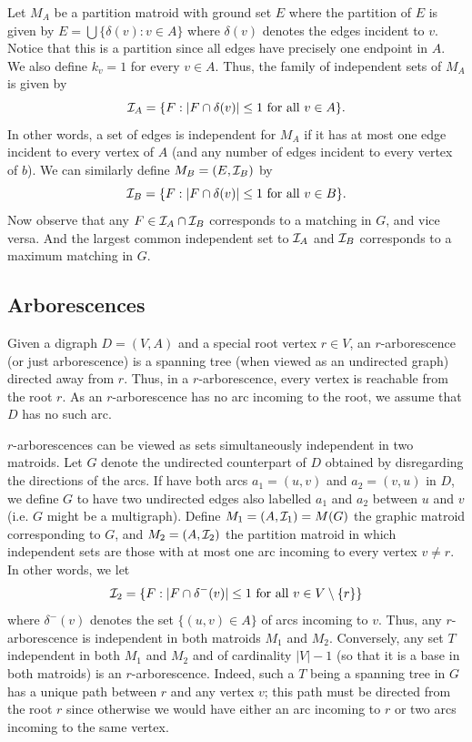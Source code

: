 \documentclass[12pt]{article}
\begin{document}
Let $M_A$  be a partition matroid with ground set $E$ where the
partition of $E$ is given by $E=\bigcup\{\delta(v): v\in A\}$ where
$\delta(v)$ denotes the edges incident to $v$. Notice that this is a
partition since all edges have precisely one endpoint in $A$. We also
define $k_v=1$ for every $v\in A$. Thus, the family of independent
sets of $M_A$ is given by 
$${\cal I}_A=\{F: |F\cap\delta(v)|\leq 1 \mbox{ for all } v\in A\}.$$
In other words, a set of edges is independent for $M_A$ if it has
at most one edge incident to every vertex of $A$ (and any number of
edges incident to every vertex of $b$). 
 We can similarly define $M_B=(E,{\cal I}_B)$ by
$${\cal I}_B=\{F: |F\cap\delta(v)|\leq 1 \mbox{ for all } v\in B\}.$$
Now observe that any $F\in {\cal I}_A\cap {\cal I}_B$ corresponds to a
matching in $G$, and vice versa. And the largest common independent
set to ${\cal I}_A$ and ${\cal I}_B$ corresponds to a maximum matching
in $G$. 

\subsection{Arborescences}
Given a digraph $D=(V,A)$ and a special root vertex $r\in V$, an
$r$-arborescence (or just arborescence) is a spanning tree (when
viewed as an undirected graph) directed
away from $r$. Thus, in a $r$-arborescence, every vertex is reachable
from the root $r$. As an $r$-arborescence has no arc incoming to the
root, we assume that $D$ has no such arc.

$r$-arborescences can be viewed as sets simultaneously independent in
two matroids.  Let $G$ denote the undirected counterpart of $D$
obtained by disregarding the directions of the arcs. If
have both arcs $a_1=(u,v)$ and $a_2=(v,u)$ in $D$, we define $G$ to have two
undirected edges also labelled $a_1$ and $a_2$ between $u$ and $v$ (i.e. $G$ might be a multigraph). Define $M_1=(A,{\cal I}_1)=M(G)$ the graphic matroid corresponding
to $G$, and $M_2=(A,{\cal I}_2)$ the partition matroid in which
independent sets are those with at most one arc incoming to every
vertex $v\neq r$. In other words, we let $${\cal I}_2=\{F: |F\cap
\delta^-(v)|\leq 1 \mbox{ for all } v\in V\setminus \{r\}\} $$ where
$\delta^-(v)$ denotes the set $\{(u,v)\in A\}$ of arcs incoming to
$v$. Thus, any $r$-arborescence is independent in both matroids $M_1$
and $M_2$. Conversely, any set $T$ independent in both $M_1$ and $M_2$
and of cardinality $|V|-1$ (so that it is a base in both matroids) is
an $r$-arborescence. Indeed, such a $T$ being a spanning tree in $G$
has a unique path between $r$ and any vertex $v$; this path must be
directed from the root $r$ since otherwise we would have either an arc
incoming to $r$ or two arcs incoming to the same vertex. 
\end{document}
